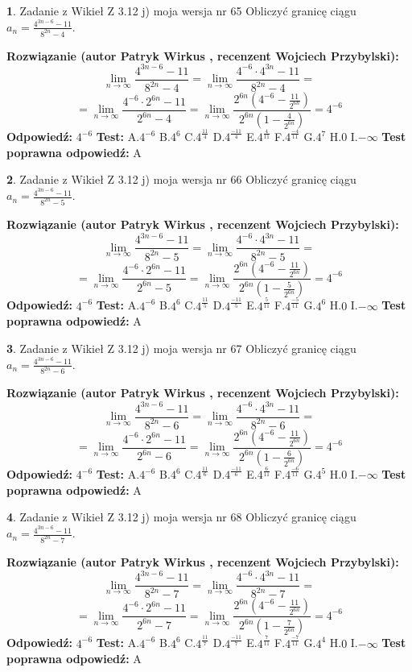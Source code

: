 \documentclass[12pt, a4paper]{article}
\theoremstyle{definition} %
\newtheorem{zad}{}
\newcommand{\zadStart}[1]{\begin{zad}#1\newline}
\newcommand{\zadStop}{\end{zad}}
\newcommand{\rozwStart}[2]{\noindent \textbf{Rozwiązanie (autor #1 , recenzent #2): }\newline}
\newcommand{\rozwStop}{\newline}
\newcommand{\odpStart}{\noindent \textbf{Odpowiedź:}\newline}
\newcommand{\odpStop}{\newline}
\newcommand{\testStart}{\noindent \textbf{Test:}\newline}
\newcommand{\testStop}{\newline}
\newcommand{\kluczStart}{\noindent \textbf{Test poprawna odpowiedź:}\newline}
\newcommand{\kluczStop}{\newline}
\begin{document}
\zadStart{Zadanie z Wikieł Z 3.12 j) moja wersja nr 65}
Obliczyć granicę ciągu $a_{n}=\frac{4^{3n-6}-11}{8^{2n}-4}$.
\zadStop
\rozwStart{Patryk Wirkus}{Wojciech Przybylski}
$$\lim\limits_{n\to\infty}\frac{4^{3n-6}-11}{8^{2n}-4}= \lim\limits_{n\to\infty}\frac{4^{-6} \cdot 4^{3n}-11}{8^{2n}-4}=$$
$$= \lim\limits_{n\to\infty}\frac{4^{-6} \cdot 2^{6n}-11}{2^{6n}-4}= \lim\limits_{n\to\infty}\frac{2^{6n}(4^{-6} - \frac{11}{2^{6n}})}{2^{6n}(1-\frac{4}{2^{6n}})}= 4^{-6}$$
\rozwStop
\odpStart
$4^{-6}$
\odpStop
\testStart
A.$4^{-6}$
B.$4^{6}$
C.$4^{\frac{11}{4}}$
D.$4^{\frac{-11}{4}}$
E.$4^{\frac{4}{11}}$
F.$4^{\frac{-4}{11}}$
G.$4^{7}$
H.$0$
I.$-\infty$
\testStop
\kluczStart
A
\kluczStop



\zadStart{Zadanie z Wikieł Z 3.12 j) moja wersja nr 66}
Obliczyć granicę ciągu $a_{n}=\frac{4^{3n-6}-11}{8^{2n}-5}$.
\zadStop
\rozwStart{Patryk Wirkus}{Wojciech Przybylski}
$$\lim\limits_{n\to\infty}\frac{4^{3n-6}-11}{8^{2n}-5}= \lim\limits_{n\to\infty}\frac{4^{-6} \cdot 4^{3n}-11}{8^{2n}-5}=$$
$$= \lim\limits_{n\to\infty}\frac{4^{-6} \cdot 2^{6n}-11}{2^{6n}-5}= \lim\limits_{n\to\infty}\frac{2^{6n}(4^{-6} - \frac{11}{2^{6n}})}{2^{6n}(1-\frac{5}{2^{6n}})}= 4^{-6}$$
\rozwStop
\odpStart
$4^{-6}$
\odpStop
\testStart
A.$4^{-6}$
B.$4^{6}$
C.$4^{\frac{11}{5}}$
D.$4^{\frac{-11}{5}}$
E.$4^{\frac{5}{11}}$
F.$4^{\frac{-5}{11}}$
G.$4^{6}$
H.$0$
I.$-\infty$
\testStop
\kluczStart
A
\kluczStop



\zadStart{Zadanie z Wikieł Z 3.12 j) moja wersja nr 67}
Obliczyć granicę ciągu $a_{n}=\frac{4^{3n-6}-11}{8^{2n}-6}$.
\zadStop
\rozwStart{Patryk Wirkus}{Wojciech Przybylski}
$$\lim\limits_{n\to\infty}\frac{4^{3n-6}-11}{8^{2n}-6}= \lim\limits_{n\to\infty}\frac{4^{-6} \cdot 4^{3n}-11}{8^{2n}-6}=$$
$$= \lim\limits_{n\to\infty}\frac{4^{-6} \cdot 2^{6n}-11}{2^{6n}-6}= \lim\limits_{n\to\infty}\frac{2^{6n}(4^{-6} - \frac{11}{2^{6n}})}{2^{6n}(1-\frac{6}{2^{6n}})}= 4^{-6}$$
\rozwStop
\odpStart
$4^{-6}$
\odpStop
\testStart
A.$4^{-6}$
B.$4^{6}$
C.$4^{\frac{11}{6}}$
D.$4^{\frac{-11}{6}}$
E.$4^{\frac{6}{11}}$
F.$4^{\frac{-6}{11}}$
G.$4^{5}$
H.$0$
I.$-\infty$
\testStop
\kluczStart
A
\kluczStop



\zadStart{Zadanie z Wikieł Z 3.12 j) moja wersja nr 68}
Obliczyć granicę ciągu $a_{n}=\frac{4^{3n-6}-11}{8^{2n}-7}$.
\zadStop
\rozwStart{Patryk Wirkus}{Wojciech Przybylski}
$$\lim\limits_{n\to\infty}\frac{4^{3n-6}-11}{8^{2n}-7}= \lim\limits_{n\to\infty}\frac{4^{-6} \cdot 4^{3n}-11}{8^{2n}-7}=$$
$$= \lim\limits_{n\to\infty}\frac{4^{-6} \cdot 2^{6n}-11}{2^{6n}-7}= \lim\limits_{n\to\infty}\frac{2^{6n}(4^{-6} - \frac{11}{2^{6n}})}{2^{6n}(1-\frac{7}{2^{6n}})}= 4^{-6}$$
\rozwStop
\odpStart
$4^{-6}$
\odpStop
\testStart
A.$4^{-6}$
B.$4^{6}$
C.$4^{\frac{11}{7}}$
D.$4^{\frac{-11}{7}}$
E.$4^{\frac{7}{11}}$
F.$4^{\frac{-7}{11}}$
G.$4^{4}$
H.$0$
I.$-\infty$
\testStop
\kluczStart
A
\kluczStop
\end{document}
